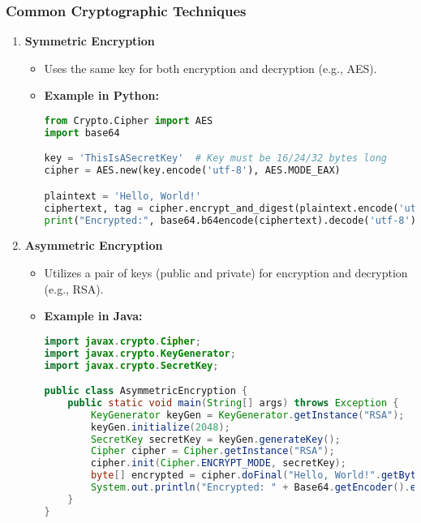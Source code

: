 \documentclass{beamer}
\begin{document}
\begin{frame}[fragile]
    \frametitle{Common Cryptographic Techniques}
    \begin{enumerate}
        \item \textbf{Symmetric Encryption}
            \begin{itemize}
                \item Uses the same key for both encryption and decryption (e.g., AES).
                \item \textbf{Example in Python:}
                \begin{lstlisting}[language=Python]
from Crypto.Cipher import AES
import base64

key = 'ThisIsASecretKey'  # Key must be 16/24/32 bytes long
cipher = AES.new(key.encode('utf-8'), AES.MODE_EAX)

plaintext = 'Hello, World!'
ciphertext, tag = cipher.encrypt_and_digest(plaintext.encode('utf-8'))
print("Encrypted:", base64.b64encode(ciphertext).decode('utf-8'))
                \end{lstlisting}
            \end{itemize}
        \item \textbf{Asymmetric Encryption}
            \begin{itemize}
                \item Utilizes a pair of keys (public and private) for encryption and decryption (e.g., RSA).
                \item \textbf{Example in Java:}
                \begin{lstlisting}[language=Java]
import javax.crypto.Cipher;
import javax.crypto.KeyGenerator;
import javax.crypto.SecretKey;

public class AsymmetricEncryption {
    public static void main(String[] args) throws Exception {
        KeyGenerator keyGen = KeyGenerator.getInstance("RSA");
        keyGen.initialize(2048);
        SecretKey secretKey = keyGen.generateKey();
        Cipher cipher = Cipher.getInstance("RSA");
        cipher.init(Cipher.ENCRYPT_MODE, secretKey);
        byte[] encrypted = cipher.doFinal("Hello, World!".getBytes());
        System.out.println("Encrypted: " + Base64.getEncoder().encodeToString(encrypted));
    }
}
                \end{lstlisting}
            \end{itemize}
    \end{enumerate}
\end{frame}
\end{document}
